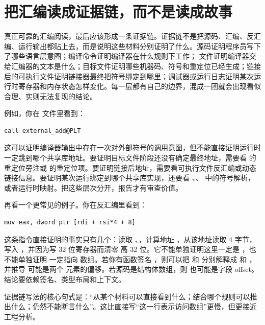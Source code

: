 \section{把汇编读成证据链，而不是读成故事}

真正可靠的汇编阅读，最后应该形成一条证据链。证据链不是把源码、汇编、反汇编、运行输出都贴上去，而是说明这些材料分别证明了什么。源码证明程序员写下了哪些语言层意图；编译命令证明编译器在什么规则下工作； 文件证明编译器交给汇编器的文本是什么；目标文件证明哪些机器码、符号和重定位已经生成；链接后的可执行文件证明链接器最终把符号绑定到哪里；调试器或运行日志证明某次运行时寄存器和内存状态怎样变化。每一层都有自己的边界，混成一团就会出现看似合理、实则无法复现的结论。

例如，你在  文件里看到：

\begin{lstlisting}
call external_add@PLT
\end{lstlisting}

这可以证明编译器输出中存在一次对外部符号的调用意图，但不能直接证明运行时一定跳到哪个共享库地址。要证明目标文件阶段还没有确定最终地址，需要看  的重定位旁注或  的重定位项。要证明链接后地址，需要看可执行文件反汇编或动态链接信息。要证明某次运行绑定到哪个共享库实现，还要看 、、 中的符号解析，或者运行时映射。把这些层次分开，报告才有审查价值。

再看一个更常见的例子。你在反汇编里看到：

\begin{lstlisting}
mov eax, dword ptr [rdi + rsi*4 + 8]
\end{lstlisting}

这条指令直接证明的事实只有几个：读取 、，计算地址 ，从该地址读取 4 字节，写入 ，并因为写 32 位寄存器而清零  高 32 位。它不能单独证明这里一定是 ，也不能单独证明  一定指向  数组。若你有函数签名 ，则可以把  和  分别解释成  和 ，并推导  可能是两个  元素的偏移。若源码是结构体数组，则  也可能是字段 offset。结论要依赖签名、类型布局和上下文。

\begin{mentalmodel}
证据链写法的核心句式是：“从某个材料可以直接看到什么；结合哪个规则可以推出什么；仍然不能断言什么”。这比直接写“这一行表示访问数组”更慢，但更接近工程分析。
\end{mentalmodel}


